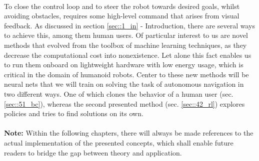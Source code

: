 \\
To close the control loop and to steer the robot towards desired goals, whilst avoiding obstacles, requires some high-level command that arises from visual feedback. As discussed in section \ref{sec::1_in} - Introduction, there are several ways to achieve this, among them human users. Of particular interest to us are novel methods that evolved from the toolbox of machine learning techniques, as they decrease the computational cost into nonexistence. Let alone this fact enables us to run them onboard on lightweight hardware with low energy usage, which is critical in the domain of humanoid robots. Center to these new methods will be neural nets that we will train on solving the task of autonomous navigation in two different ways. One of which clones the behavior of a human user (sec. \ref{sec::51_bc}), whereas the second presented method (sec. \ref{sec::42_rl}) explores policies and tries to find solutions on its own.
\\\\
\textbf{Note:} Within the following chapters, there will always be made references to the actual implementation of the presented concepts, which shall enable future readers to bridge the gap between theory and application.